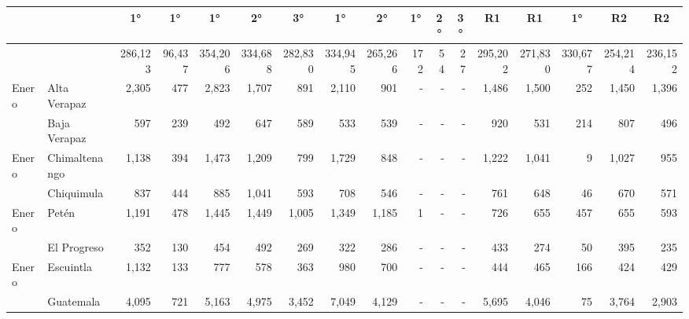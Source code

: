 \begin{landscape}
\begin{center}
\begin{longtable}{llrrrrrrrrrrrrrrr}
			\multicolumn{1}{c}{ }&\multicolumn{1}{c}{ }&	\multicolumn{1}{c}{1°}&		\multicolumn{1}{c}{1°}&		\multicolumn{1}{c}{1°}&		\multicolumn{1}{c}{2°}&		\multicolumn{1}{c}{3°}&		\multicolumn{1}{c}{1°}&		\multicolumn{1}{c}{2°}&		\multicolumn{1}{c}{1°}&		\multicolumn{1}{c}{2°}&		\multicolumn{1}{c}{3°}&		\multicolumn{1}{c}{R1}&		\multicolumn{1}{c}{R1}&		\multicolumn{1}{c}{1°}&	\multicolumn{1}{c}{R2}&		\multicolumn{1}{c}{R2}	\\\hline\endhead
			\rowcolor{color1!40!white} \multicolumn{1}{l}{\Bold{	\footnotesize	 Total 	}}&		&	 286,123 	&	 96,437 	&	 354,206 	&	 334,688 	&	 282,830 	&	 334,945 	&	 265,266 	&	 172 	&	 54 	&	 27 	&	 295,202 	&	 271,830 	&	 330,677 	&	 254,214 	&	 236,152 	\\
			\multicolumn{1}{l}{	\footnotesize	 Enero 	}&	 Alta Verapaz 	&	 2,305 	&	 477 	&	 2,823 	&	 1,707 	&	 891 	&	 2,110 	&	 901 	&	 -   	&	 -   	&	 -   	&	 1,486 	&	 1,500 	&	 252 	&	 1,450 	&	 1,396 	\\
			\rowcolor{color1!5!white}\multicolumn{1}{l}{	\footnotesize	 Enero 	}&	 Baja Verapaz 	&	 597 	&	 239 	&	 492 	&	 647 	&	 589 	&	 533 	&	 539 	&	 -   	&	 -   	&	 -   	&	 920 	&	 531 	&	 214 	&	 807 	&	 496 	\\
			\multicolumn{1}{l}{	\footnotesize	 Enero 	}&	 Chimaltenango 	&	 1,138 	&	 394 	&	 1,473 	&	 1,209 	&	 799 	&	 1,729 	&	 848 	&	 -   	&	 -   	&	 -   	&	 1,222 	&	 1,041 	&	 9 	&	 1,027 	&	 955 	\\
			\rowcolor{color1!5!white}\multicolumn{1}{l}{	\footnotesize	 Enero 	}&	 Chiquimula 	&	 837 	&	 444 	&	 885 	&	 1,041 	&	 593 	&	 708 	&	 546 	&	 -   	&	 -   	&	 -   	&	 761 	&	 648 	&	 46 	&	 670 	&	 571 	\\
			\multicolumn{1}{l}{	\footnotesize	 Enero 	}&	 Petén 	&	 1,191 	&	 478 	&	 1,445 	&	 1,449 	&	 1,005 	&	 1,349 	&	 1,185 	&	 1 	&	 -   	&	 -   	&	 726 	&	 655 	&	 457 	&	 655 	&	 593 	\\
			\rowcolor{color1!5!white}\multicolumn{1}{l}{	\footnotesize	 Enero 	}&	 El Progreso 	&	 352 	&	 130 	&	 454 	&	 492 	&	 269 	&	 322 	&	 286 	&	 -   	&	 -   	&	 -   	&	 433 	&	 274 	&	 50 	&	 395 	&	 235 	\\
			\multicolumn{1}{l}{	\footnotesize	 Enero 	}&	 Escuintla 	&	 1,132 	&	 133 	&	 777 	&	 578 	&	 363 	&	 980 	&	 700 	&	 -   	&	 -   	&	 -   	&	 444 	&	 465 	&	 166 	&	 424 	&	 429 	\\
			\rowcolor{color1!5!white}\multicolumn{1}{l}{	\footnotesize	 Enero 	}&	 Guatemala 	&	 4,095 	&	 721 	&	 5,163 	&	 4,975 	&	 3,452 	&	 7,049 	&	 4,129 	&	 -   	&	 -   	&	 -   	&	 5,695 	&	 4,046 	&	 75 	&	 3,764 	&	 2,903 	\\

\end{longtable}
\end{center}
\end{landscape}
